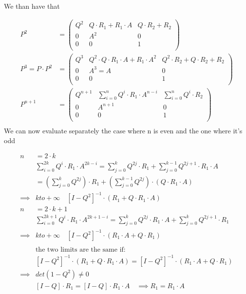 We than have that

\begin{equation}\begin{split}
  P^2&=\begin{pmatrix}
      Q^2 & Q \cdot R_1 + R_1 \cdot A & Q \cdot R_2  + R_2\\
      0 & A^2   & 0 \\
      0 & 0   & 1 \\
  \end{pmatrix}
  \\
  P^{3} = P \cdot P^2 &=\begin{pmatrix}
      Q^3 & Q^2 \cdot Q \cdot R_1\cdot A + R_1 \cdot A^2 & Q^2 \cdot R_2  + Q \cdot R_2 +R_2\\
      0 & A^3=A   & 0 \\
      0 & 0   & 1 \\
  \end{pmatrix}\\
  P^{n+1}&=\begin{pmatrix}
      Q^{n+1} & \sum\limits_{i=0}^n Q^i \cdot R_1 \cdot A^{n-i} & \sum\limits_{i=0}^n Q^i \cdot R_2\\
      0 & A^{n+1}   & 0 \\
      0 & 0   & 1 \\
  \end{pmatrix}\\
\end{split}\end{equation}
We can now evaluate separately the case where n is even and the one where it's odd

\begin{equation}\begin{split}
  n &= 2 \cdot k \\
  &\sum\limits_{i=0}^{2k}Q^i \cdot R_1 \cdot A^{2k-i} = \sum\limits_{j=0}^{k}Q^{2j} \cdot R_1 + \sum\limits_{j=0}^{k-1}Q^{2j+1} \cdot R_1 \cdot A \\
  &=\left(\sum\limits_{j=0}^{k}Q^{2j} \right) \cdot R_1 + \left(\sum\limits_{j=0}^{k-1}Q^{2j} \right) \cdot (Q \cdot R_1 \cdot A)\\
  \implies & k  to +\infty \quad [I - Q^2]^{-1} \cdot (R_1 + Q \cdot R_1 \cdot A)\\
  n &= 2 \cdot k + 1 \\
  &\sum\limits_{i=0}^{2k+1}Q^i \cdot R_1 \cdot A^{2k+1-i} = \sum\limits_{j=0}^{k}Q^{2j} \cdot R_1\cdot A + \sum\limits_{j=0}^{k}Q^{2j+1} \cdot R_1 \\
  \implies & k  to +\infty \quad [I - Q^2]^{-1} \cdot (R_1 \cdot A + Q \cdot R_1 ) \\
  \\
  &\text{the two limits are the same if: }\\
  & [I - Q^2]^{-1} \cdot (R_1 + Q \cdot R_1 \cdot A) = [I - Q^2]^{-1} \cdot (R_1 \cdot A + Q \cdot R_1 )\\
  \implies & det(1-Q^2)\neq 0\\
  & [I-Q ]\cdot R_1 = [I-Q]\cdot R_1 \cdot A \quad \implies R_1 = R_1 \cdot A
\end{split}\end{equation}


